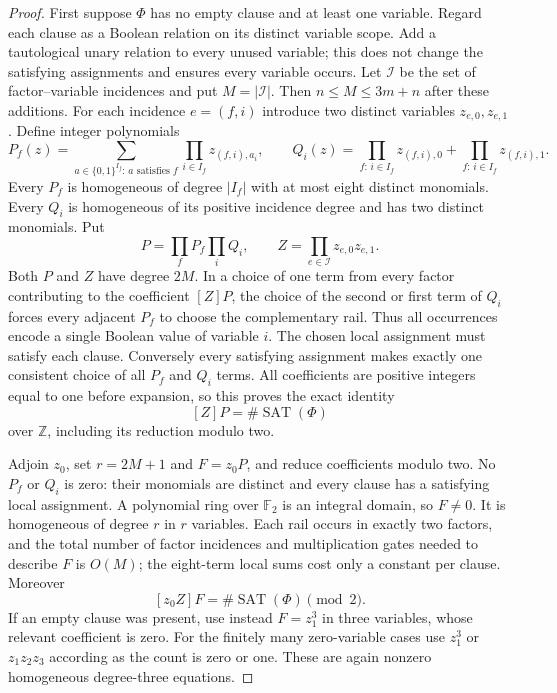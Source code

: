 \begin{proof}
First suppose $\Phi$ has no empty clause and at least one variable. Regard each clause as a Boolean relation on its distinct variable scope. Add a tautological unary relation to every unused variable; this does not change the satisfying assignments and ensures every variable occurs. Let $\mathcal I$ be the set of factor--variable incidences and put $M=|\mathcal I|$. Then $n\leq M\leq3m+n$ after these additions. For each incidence $e=(f,i)$ introduce two distinct variables $z_{e,0},z_{e,1}$. Define integer polynomials
\[
 P_f(z)=\sum_{a\in\{0,1\}^{I_f}:\,a\text{ satisfies }f}
              \prod_{i\in I_f}z_{(f,i),a_i},
 \qquad
 Q_i(z)=\prod_{f:\,i\in I_f}z_{(f,i),0}
             +\prod_{f:\,i\in I_f}z_{(f,i),1}.
\]
Every $P_f$ is homogeneous of degree $|I_f|$ with at most eight distinct monomials. Every $Q_i$ is homogeneous of its positive incidence degree and has two distinct monomials. Put
\[
 P=\prod_f P_f\prod_i Q_i,\qquad
 Z=\prod_{e\in\mathcal I}z_{e,0}z_{e,1}.
\]
Both $P$ and $Z$ have degree $2M$. In a choice of one term from every factor contributing to the coefficient $[Z]P$, the choice of the second or first term of $Q_i$ forces every adjacent $P_f$ to choose the complementary rail. Thus all occurrences encode a single Boolean value of variable $i$. The chosen local assignment must satisfy each clause. Conversely every satisfying assignment makes exactly one consistent choice of all $P_f$ and $Q_i$ terms. All coefficients are positive integers equal to one before expansion, so this proves the exact identity
\[
 [Z]P=\#\operatorname{SAT}(\Phi)
\]
over $\mathbb Z$, including its reduction modulo two.

Adjoin $z_0$, set $r=2M+1$ and $F=z_0P$, and reduce coefficients modulo two. No $P_f$ or $Q_i$ is zero: their monomials are distinct and every clause has a satisfying local assignment. A polynomial ring over $\mathbb F_2$ is an integral domain, so $F\ne0$. It is homogeneous of degree $r$ in $r$ variables. Each rail occurs in exactly two factors, and the total number of factor incidences and multiplication gates needed to describe $F$ is $O(M)$; the eight-term local sums cost only a constant per clause. Moreover
\[
 [z_0Z]F=\#\operatorname{SAT}(\Phi)\pmod2.
\]
If an empty clause was present, use instead $F=z_1^3$ in three variables, whose relevant coefficient is zero. For the finitely many zero-variable cases use $z_1^3$ or $z_1z_2z_3$ according as the count is zero or one. These are again nonzero homogeneous degree-three equations.


\end{proof}
